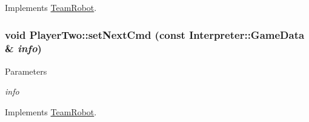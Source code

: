 Implements \hyperlink{classTeamRobot_a34c0fd6986c510d4025e5752b3c0e49a}{TeamRobot}.

\hypertarget{classPlayerTwo_a7ac9a9a4f1dedee2006e6a0c79f37c0c}{
\subsubsection[{setNextCmd}]{\setlength{\rightskip}{0pt plus 5cm}void PlayerTwo::setNextCmd (const {\bf Interpreter::GameData} \& {\em info})}}
\label{classPlayerTwo_a7ac9a9a4f1dedee2006e6a0c79f37c0c}

\begin{DoxyParams}{Parameters}
\item[{\em info}]\end{DoxyParams}


Implements \hyperlink{classTeamRobot_a65f9a2b7464dfac3f4a0336810cf574f}{TeamRobot}.



